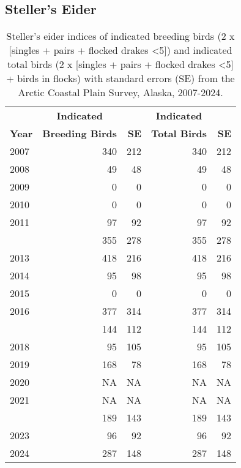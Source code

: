\documentclass[
]{article}
\begin{document}
\subsection*{Steller's Eider}\label{stellers-eider-1}

\begingroup\fontsize{10}{12}\selectfont

\begin{longtable}[t]{lrrrr}

\caption{\label{tbl-STEI}Steller's eider indices of indicated breeding
birds (2 x {[}singles + pairs + flocked drakes \textless5{]}) and
indicated total birds (2 x {[}singles + pairs + flocked drakes
\textless5{]} + birds in flocks) with standard errors (SE) from the
Arctic Coastal Plain Survey, Alaska, 2007-2024.}

\tabularnewline

\\
\toprule
\multicolumn{1}{c}{\textbf{ }} & \multicolumn{1}{c}{\textbf{Indicated}} & \multicolumn{1}{c}{\textbf{ }} & \multicolumn{1}{c}{\textbf{Indicated}} & \multicolumn{1}{c}{\textbf{ }} \\
\cmidrule(l{3pt}r{3pt}){2-2} \cmidrule(l{3pt}r{3pt}){4-4}
\textbf{Year} & \textbf{Breeding Birds} & \textbf{SE} & \textbf{Total Birds} & \textbf{SE}\\
\midrule
2007 & 340 & 212 & 340 & 212\\
2008 & 49 & 48 & 49 & 48\\
2009 & 0 & 0 & 0 & 0\\
2010 & 0 & 0 & 0 & 0\\
2011 & 97 & 92 & 97 & 92\\
\addlinespace
2012 & 355 & 278 & 355 & 278\\
2013 & 418 & 216 & 418 & 216\\
2014 & 95 & 98 & 95 & 98\\
2015 & 0 & 0 & 0 & 0\\
2016 & 377 & 314 & 377 & 314\\
\addlinespace
2017 & 144 & 112 & 144 & 112\\
2018 & 95 & 105 & 95 & 105\\
2019 & 168 & 78 & 168 & 78\\
2020 & NA & NA & NA & NA\\
2021 & NA & NA & NA & NA\\
\addlinespace
2022 & 189 & 143 & 189 & 143\\
2023 & 96 & 92 & 96 & 92\\
2024 & 287 & 148 & 287 & 148\\
\bottomrule

\end{longtable}
\end{document}
